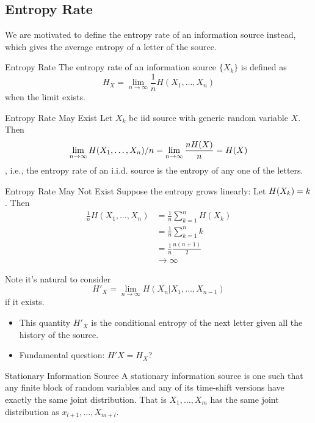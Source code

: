 \documentclass[../main.tex]{subfiles}
\begin{document}
\subsection{Entropy Rate}
We are motivated to define the entropy rate of an information source instead, which gives the average entropy of a letter of the source.
\begin{gbox}{Entropy Rate}
    The entropy rate of an information source $\{X_k\}$ is defined as \begin{equation*}
        H_X = \lim_{n\to \infty} \frac{1}{n}H(X_1,\dots,X_n)
    \end{equation*} when the limit exists.
\end{gbox}
\begin{pbox}{Entropy Rate May Exist}
    Let $X_k$ be iid source with generic random variable $X$. Then \begin{equation*}
        \lim_{n\to\infty}H(X_1,\dots,X_n)/n =\lim_{n\to\infty}\frac{n H(X)}{n}=H(X)
    \end{equation*},
    i.e., the entropy rate of an i.i.d. source is the entropy of any one of the letters.
\end{pbox}
\begin{pbox}{Entropy Rate May Not Exist}
    Suppose the entropy grows linearly: Let $H(X_k) = k$. Then \begin{align*}
        \frac{1}{n}H(X_1,\dots,X_n)&= \frac{1}{n}\sum_{k=1}^nH(X_k)\\
        &= \frac{1}{n}\sum_{k=1}^nk\\
        &=\frac{1}{n}\frac{n(n+1)}{2}\\
        &\to\infty
    \end{align*} 
\end{pbox}
Note it's natural to consider \begin{equation*}
    H'_X = \lim_{n\to\infty}H(X_n|X_1,\dots,X_{n-1})
\end{equation*} if it exists.
\begin{itemize}
    \item This quantity $H'_X$ is the conditional entropy of the next letter given all the history of the source.
    \item Fundamental question: $H'X=H_X$?
 \end{itemize}
 \begin{gbox}{Stationary Information Source}
     A stationary information source is one such that any finite block of random variables and any of its time-shift versions have exactly the same joint distribution. That is $X_1,\dots,X_m$ has the same joint distribution as $x_{l+1},\dots,X_{m+l}$. 
 \end{gbox}
\end{document}
